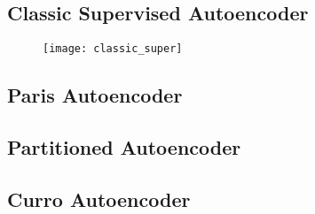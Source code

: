 \subsection{Classic Supervised Autoencoder}

\begin{figure}[!ht]
\centering
\texttt{[image: classic\_super]}
\caption{}
\end{figure}

\subsection{Paris Autoencoder}


\subsection{Partitioned Autoencoder}


\subsection{Curro Autoencoder}
